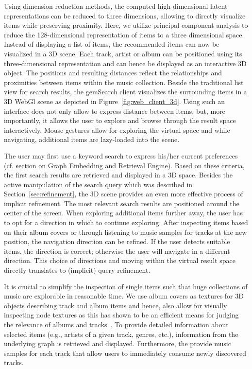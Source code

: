 \documentclass[sigconf]{acmart}
\begin{document}
Using dimension reduction methods, the computed high-dimensional latent representations can be reduced to three dimensions, allowing to directly visualize items while preserving proximity. Here, we utilize principal component analysis to reduce the 128-dimensional representation of items to a three dimensional space. Instead of displaying a list of items, the recommended items can now be visualized in a 3D scene. Each track, artist or album can be positioned using its three-dimensional representation and can hence be displayed as an interactive 3D object. The positions and resulting distances reflect the relationships and proximities between items within the music collection. Beside the traditional list view for search results, the gemSearch client visualizes the surrounding items in a 3D WebGl scene as depicted in Figure~\ref{fig:web_client_3d}. Using such an interface does not only allow to express distance between items, but, more importantly, it allows the user to explore and browse through the result space interactively. Mouse gestures allow for exploring the virtual space and while navigating, additional items are lazy-loaded into the scene. 



The user may first use a keyword search to express his/her current preferences (cf. section on Graph Embedding and Retrieval Engine). Based on these criteria, the first search results are retrieved and displayed in a 3D space. Besides the active manipulation of the search query which was described in Section~\ref{sec:refinement}, the 3D scene provides an even more effective process of implicit refinement. The most relevant search results are positioned around the center of the screen. When exploring additional items further away, the user has to opt for a direction in which to continue exploring. After inspecting items based on their album covers or through listening to music samples for tracks at the new position, the navigation direction can be refined. If the user detects suitable items, the direction is correct; otherwise the user will navigate in a different direction. This choice of directions and moving within the virtual result space directly translates to (implicit) query refinement. 


It is crucial to simplify the inspection of single items such that huge collections of music are explorable in reasonable time. We use album covers as textures for 3D objects describing track and album items and hence, also allow for visually inspecting node textures as this has shown to be an efficient means for judging the relevance of albums and tracks~\cite{libeks2011you}. To provide detailed information about selected items (e.g., artists of a given track, genres, etc.), information from the underlying graph is retrieved and displayed. Furthermore, the provide music samples for each track that allow users to immediately consume newly discovered tracks. \\
\end{document}
